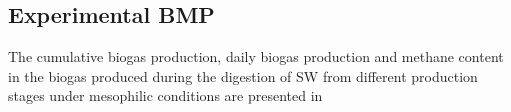 \subsection{Experimental BMP}
The cumulative biogas production, daily biogas production and methane content in the biogas produced during the digestion of SW from different production stages under mesophilic conditions are presented in